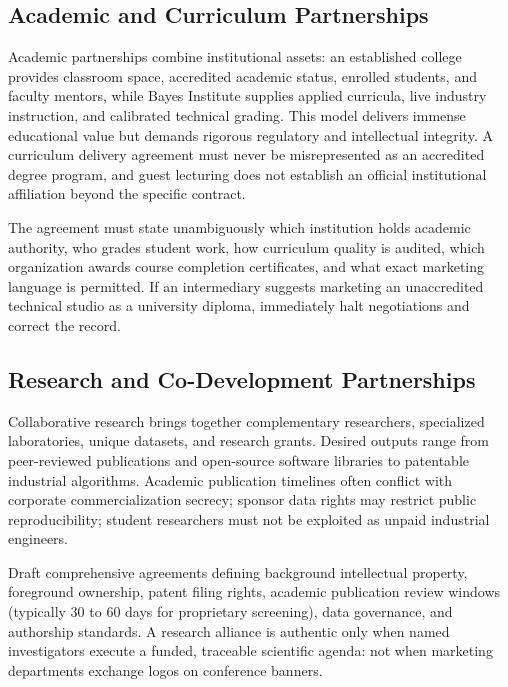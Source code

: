 \subsection{Academic and Curriculum Partnerships}
\label{sec:academic_curriculum_partnerships}

Academic partnerships combine institutional assets: an established college provides classroom space, accredited academic status, enrolled students, and faculty mentors, while Bayes Institute supplies applied curricula, live industry instruction, and calibrated technical grading. This model delivers immense educational value but demands rigorous regulatory and intellectual integrity. A curriculum delivery agreement must never be misrepresented as an accredited degree program, and guest lecturing does not establish an official institutional affiliation beyond the specific contract.

The agreement must state unambiguously which institution holds academic authority, who grades student work, how curriculum quality is audited, which organization awards course completion certificates, and what exact marketing language is permitted. If an intermediary suggests marketing an unaccredited technical studio as a university diploma, immediately halt negotiations and correct the record.

\subsection{Research and Co-Development Partnerships}
\label{sec:research_co_development_partnerships}

Collaborative research brings together complementary researchers, specialized laboratories, unique datasets, and research grants. Desired outputs range from peer-reviewed publications and open-source software libraries to patentable industrial algorithms. Academic publication timelines often conflict with corporate commercialization secrecy; sponsor data rights may restrict public reproducibility; student researchers must not be exploited as unpaid industrial engineers.

Draft comprehensive agreements defining background intellectual property, foreground ownership, patent filing rights, academic publication review windows (typically 30 to 60 days for proprietary screening), data governance, and authorship standards. A research alliance is authentic only when named investigators execute a funded, traceable scientific agenda: not when marketing departments exchange logos on conference banners.

